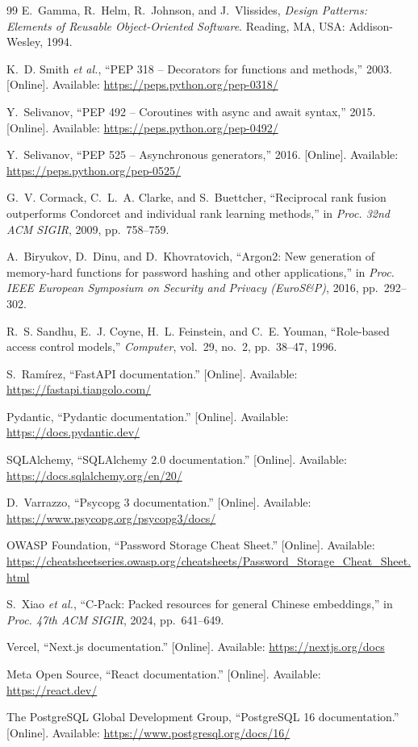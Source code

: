\documentclass[11pt,a4paper,oneside]{report}
\begin{document}
\begin{thebibliography}{99}
E.~Gamma, R.~Helm, R.~Johnson, and J.~Vlissides, \emph{Design Patterns: Elements of Reusable
Object-Oriented Software}. Reading, MA, USA: Addison-Wesley, 1994.

K.~D. Smith \emph{et al.}, ``PEP 318 -- Decorators for functions and methods,'' 2003.
[Online]. Available: \url{https://peps.python.org/pep-0318/}

Y.~Selivanov, ``PEP 492 -- Coroutines with async and await syntax,'' 2015. [Online].
Available: \url{https://peps.python.org/pep-0492/}

Y.~Selivanov, ``PEP 525 -- Asynchronous generators,'' 2016. [Online]. Available:
\url{https://peps.python.org/pep-0525/}

G.~V. Cormack, C.~L.~A. Clarke, and S.~Buettcher, ``Reciprocal rank fusion outperforms
Condorcet and individual rank learning methods,'' in \emph{Proc. 32nd ACM SIGIR}, 2009,
pp.~758--759.

A.~Biryukov, D.~Dinu, and D.~Khovratovich, ``Argon2: New generation of memory-hard functions
for password hashing and other applications,'' in \emph{Proc. IEEE European Symposium on
Security and Privacy (EuroS\&P)}, 2016, pp.~292--302.

R.~S. Sandhu, E.~J. Coyne, H.~L. Feinstein, and C.~E. Youman, ``Role-based access control
models,'' \emph{Computer}, vol.~29, no.~2, pp.~38--47, 1996.

S.~Ram\'irez, ``FastAPI documentation.'' [Online]. Available:
\url{https://fastapi.tiangolo.com/}

Pydantic, ``Pydantic documentation.'' [Online]. Available:
\url{https://docs.pydantic.dev/}

SQLAlchemy, ``SQLAlchemy 2.0 documentation.'' [Online]. Available:
\url{https://docs.sqlalchemy.org/en/20/}

D.~Varrazzo, ``Psycopg 3 documentation.'' [Online]. Available:
\url{https://www.psycopg.org/psycopg3/docs/}

OWASP Foundation, ``Password Storage Cheat Sheet.'' [Online]. Available:
\url{https://cheatsheetseries.owasp.org/cheatsheets/Password_Storage_Cheat_Sheet.html}

S.~Xiao \emph{et al.}, ``C-Pack: Packed resources for general Chinese embeddings,'' in
\emph{Proc. 47th ACM SIGIR}, 2024, pp.~641--649.

Vercel, ``Next.js documentation.'' [Online]. Available: \url{https://nextjs.org/docs}

Meta Open Source, ``React documentation.'' [Online]. Available: \url{https://react.dev/}

The PostgreSQL Global Development Group, ``PostgreSQL 16 documentation.'' [Online].
Available: \url{https://www.postgresql.org/docs/16/}

\end{thebibliography}
\end{document}
